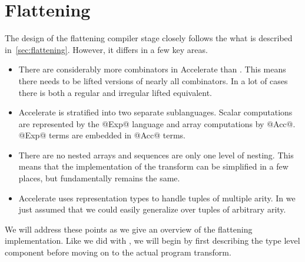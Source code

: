 
\section{Flattening}
The design of the flattening compiler stage closely follows the what is described in~\ref{sec:flattening}. However, it differs in a few key areas.
%
\begin{itemize}
\item There are considerably more combinators in Accelerate than \ndp{}. This means there needs to be lifted versions of nearly all combinators. In a lot of cases there is both a regular and irregular lifted equivalent.
%
\item Accelerate is stratified into two separate sublanguages. Scalar computations are represented by the @Exp@ language and array computations by @Acc@. @Exp@ terms are embedded in @Acc@ terms.
%
\item There are no nested arrays and sequences are only one level of nesting. This means that the implementation of the transform can be simplified in a few places, but fundamentally remains the same.
%
%
\item Accelerate uses representation types to handle tuples of multiple arity. In \ndp we just assumed that we could easily generalize over tuples of arbitrary arity.
%
\end{itemize}
%
We will address these points as we give an overview of the flattening implementation. Like we did with \ndp{}, we will begin by first describing the type level component before moving on to the actual program transform.

